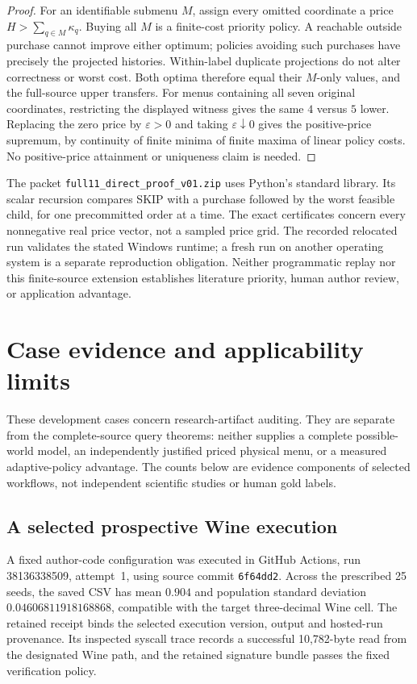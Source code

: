 \documentclass[pdflatex,sn-mathphys-num]{sn-jnl}
\theoremstyle{thmstyleone}
\theoremstyle{thmstylethree}
\theoremstyle{thmstyletwo}
\begin{document}
\begin{proof}
For an identifiable submenu $M$, assign every omitted coordinate a
price $H>\sum_{q\in M}\kappa_q$. Buying all $M$ is a finite-cost priority
policy. A reachable outside purchase cannot improve either optimum;
policies avoiding such purchases have precisely the projected
histories. Within-label duplicate projections do not alter correctness
or worst cost. Both optima therefore equal their $M$-only values, and
the full-source upper transfers.
For menus containing all seven original coordinates, restricting the
displayed witness gives the same $4$ versus $5$ lower.
Replacing the zero price by $\varepsilon>0$ and taking
$\varepsilon\downarrow0$ gives the positive-price supremum, by
continuity of finite minima of finite maxima of linear policy costs.
No positive-price attainment or uniqueness claim is needed.
\end{proof}

The packet \texttt{full11\_direct\_proof\_v01.zip} uses Python's standard
library. Its scalar recursion compares SKIP with a purchase followed by
the worst feasible child, for one precommitted order at a time.
The exact certificates concern every nonnegative real price vector,
not a sampled price grid.
The recorded relocated run validates the stated Windows runtime;
a fresh run on another operating system is a separate reproduction
obligation. Neither programmatic replay nor this finite-source
extension establishes literature priority, human author review,
or application advantage.


\section{Case evidence and applicability limits}\label{app:cases}
These development cases concern research-artifact auditing. They are separate from the complete-source query theorems: neither supplies a complete possible-world model, an independently justified priced physical menu, or a measured adaptive-policy advantage. The counts below are evidence components of selected workflows, not independent scientific studies or human gold labels.

\subsection{A selected prospective Wine execution}
A fixed author-code configuration was executed in GitHub Actions, run 38136338509, attempt~1, using source commit \texttt{6f64dd2}. Across the prescribed 25 seeds, the saved CSV has mean $0.904$ and population standard deviation $0.04606811918168868$, compatible with the target three-decimal Wine cell. The retained receipt binds the selected execution version, output and hosted-run provenance. Its inspected syscall trace records a successful 10,782-byte read from the designated Wine path, and the retained signature bundle passes the fixed verification policy.
\end{document}
